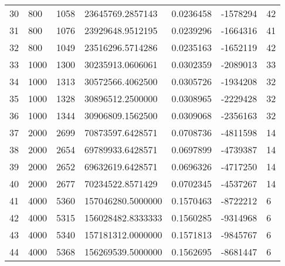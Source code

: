 \begin{longtable}{lllllll}
    30               & 800            & 1058           & 23645769.2857143   & 0.0236458        & -1578294        & 42                   \\
    31               & 800            & 1076           & 23929648.9512195   & 0.0239296        & -1664316        & 41                   \\
    32               & 800            & 1049           & 23516296.5714286   & 0.0235163        & -1652119        & 42                   \\
    33               & 1000           & 1300           & 30235913.0606061   & 0.0302359        & -2089013        & 33                   \\
    34               & 1000           & 1313           & 30572566.4062500   & 0.0305726        & -1934208        & 32                   \\
    35               & 1000           & 1328           & 30896512.2500000   & 0.0308965        & -2229428        & 32                   \\
    36               & 1000           & 1344           & 30906809.1562500   & 0.0309068        & -2356163        & 32                   \\
    37               & 2000           & 2699           & 70873597.6428571   & 0.0708736        & -4811598        & 14                   \\
    38               & 2000           & 2654           & 69789933.6428571   & 0.0697899        & -4739387        & 14                   \\
    39               & 2000           & 2652           & 69632619.6428571   & 0.0696326        & -4717250        & 14                   \\
    40               & 2000           & 2677           & 70234522.8571429   & 0.0702345        & -4537267        & 14                   \\
    41               & 4000           & 5360           & 157046280.5000000  & 0.1570463        & -8722212        & 6                    \\
    42               & 4000           & 5315           & 156028482.8333333  & 0.1560285        & -9314968        & 6                    \\
    43               & 4000           & 5340           & 157181312.0000000  & 0.1571813        & -9845767        & 6                    \\
    44               & 4000           & 5368           & 156269539.5000000  & 0.1562695        & -8681447        & 6                    \\

\end{longtable}
